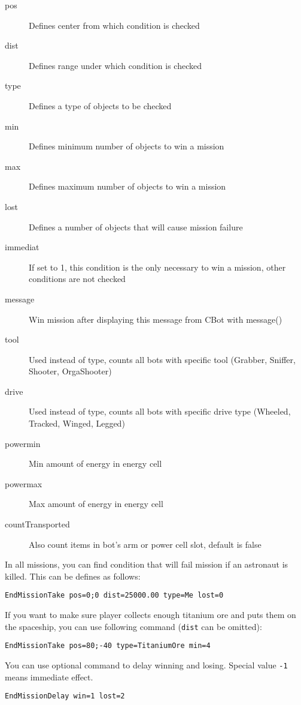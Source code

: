 \begin{description}
    \item[pos] Defines center from which condition is checked
    \item[dist] Defines range under which condition is checked
    \item[type] Defines a type of objects to be checked
    \item[min] Defines minimum number of objects to win a mission
    \item[max] Defines maximum number of objects to win a mission
    \item[lost] Defines a number of objects that will cause mission failure
    \item[immediat] If set to 1, this condition is the only necessary to win a mission, other conditions are not checked
    \item[message] Win mission after displaying this message from CBot with message() 
    \item[tool] Used instead of type, counts all bots with specific tool (Grabber, Sniffer, Shooter, OrgaShooter)
    \item[drive] Used instead of type, counts all bots with specific drive type (Wheeled, Tracked, Winged, Legged)
    \item[powermin] Min amount of energy in energy cell
    \item[powermax] Max amount of energy in energy cell
    \item[countTransported] Also count items in bot's arm or power cell slot, default is false
\end{description}

In all missions, you can find condition that will fail mission if an astronaut is killed. This can be defines as follows:

\begin{lstlisting}[style=scene]
EndMissionTake pos=0;0 dist=25000.00 type=Me lost=0
\end{lstlisting}

If you want to make sure player collects enough titanium ore and puts them on the spaceship, you can use following command (\texttt{dist} can be omitted):

\begin{lstlisting}[style=scene]
EndMissionTake pos=80;-40 type=TitaniumOre min=4
\end{lstlisting}

You can use optional command to delay winning and losing. Special value \texttt{-1} means immediate effect.

\begin{lstlisting}[style=scene]
EndMissionDelay win=1 lost=2
\end{lstlisting}
